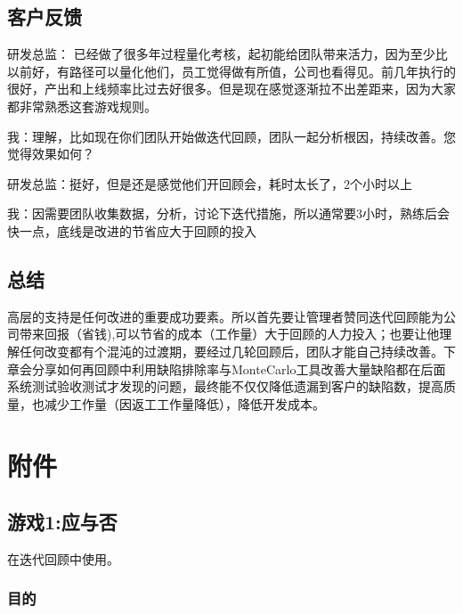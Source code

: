 \hypertarget{ux5ba2ux6237ux53cdux9988}{%
\subsection{客户反馈}\label{ux5ba2ux6237ux53cdux9988}}

研发总监：
已经做了很多年过程量化考核，起初能给团队带来活力，因为至少比以前好，有路径可以量化他们，员工觉得做有所值，公司也看得见。前几年执行的很好，产出和上线频率比过去好很多。但是现在感觉逐渐拉不出差距来，因为大家都非常熟悉这套游戏规则。

我：理解，比如现在你们团队开始做迭代回顾，团队一起分析根因，持续改善。您觉得效果如何？

研发总监：挺好，但是还是感觉他们开回顾会，耗时太长了，2个小时以上

我：因需要团队收集数据，分析，讨论下迭代措施，所以通常要3小时，熟练后会快一点，底线是改进的节省应大于回顾的投入

\hypertarget{ux603bux7ed3}{%
\subsection{总结}\label{ux603bux7ed3}}

高层的支持是任何改进的重要成功要素。所以首先要让管理者赞同迭代回顾能为公司带来回报（省钱),可以节省的成本（工作量）大于回顾的人力投入；也要让他理解任何改变都有个混沌的过渡期，要经过几轮回顾后，团队才能自己持续改善。下章会分享如何再回顾中利用缺陷排除率与MonteCarlo工具改善大量缺陷都在后面系统测试验收测试才发现的问题，最终能不仅仅降低遗漏到客户的缺陷数，提高质量，也减少工作量（因返工工作量降低），降低开发成本。

\hypertarget{ux9644ux4ef6}{%
\section{附件}\label{ux9644ux4ef6}}


\hypertarget{ux6e38ux620f1ux5e94ux4e0eux5426}{%
\subsection{游戏1:应与否}\label{ux6e38ux620f1ux5e94ux4e0eux5426}}

在迭代回顾中使用。

\hypertarget{ux76eeux7684}{%
\subsubsection{目的}\label{ux76eeux7684}}

